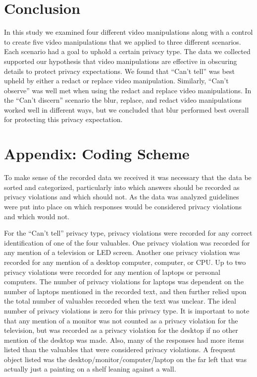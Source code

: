 \documentclass{acm_proc_article-sp}
\begin{document}
\section{Conclusion}
In this study we examined four different video manipulations along with a control to create five video manipulations that we applied to three different scenarios. Each scenario had a goal to uphold a certain privacy type. The data we collected supported our hypothesis that video manipulations are effective in obscuring details to protect privacy expectations. We found that ``Can't tell'' was best upheld by either a redact or replace video manipulation. Similarly, ``Can't observe'' was well met when using the redact and replace video manipulations. In the ``Can't discern'' scenario the blur, replace, and redact video manipulations worked well in different ways, but we concluded that blur performed best overall for protecting this privacy expectation. 


  

\section{Appendix: Coding Scheme}
To make sense of the recorded data we received it was necessary that the data be sorted and categorized, particularly into which answers should be recorded as privacy violations and which should not. As the data was analyzed guidelines were put into place on which responses would be considered privacy violations and which would not. 

For the ``Can't tell'' privacy type, privacy violations were recorded for any correct identification of one of the four valuables. One privacy violation was recorded for any mention of a television or LED screen. Another one privacy violation was recorded for any mention of a desktop computer, computer, or CPU. Up to two privacy violations were recorded for any mention of laptops or personal computers. The number of privacy violations for laptops was dependent on the number of laptops mentioned in the recorded text, and then further relied upon the total number of valuables recorded when the text was unclear. The ideal number of privacy violations is zero for this privacy type. It is important to note that any mention of a monitor was not counted as a privacy violation for the television, but was recorded as a privacy violation for the desktop if no other mention of the desktop was made. Also, many of the responses had more items listed than the valuables that were considered privacy violations. A frequent object listed was the desktop/monitor/computer/laptop on the far left that was actually just a painting on a shelf leaning against a wall. 
\end{document}
